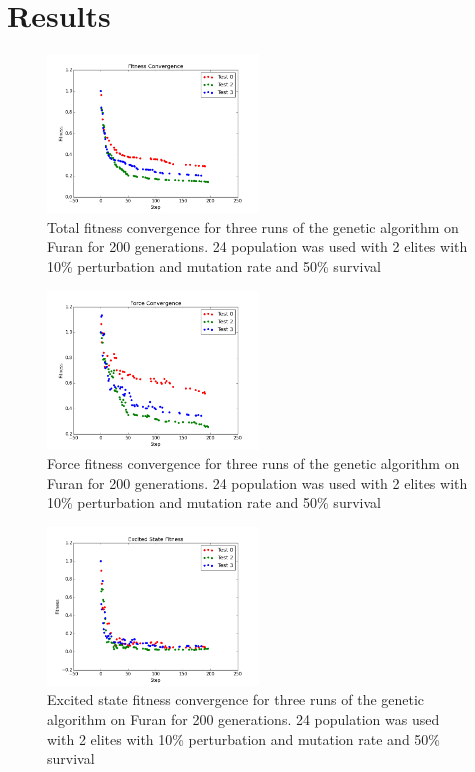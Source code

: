\documentclass[11pt, twocolumn]{article}
\begin{document}
\section{Results}
\begin{figure}[total]
  \centering
  \includegraphics[width=0.5\textwidth]{furan_convergence}
  \caption{Total fitness convergence for three runs of the genetic algorithm on Furan for 200 generations.
  24 population was used with 2 elites with 10\% perturbation and mutation rate and 50\% survival}
\end{figure}

\begin{figure}[force]
  \centering
  \includegraphics[width=0.5\textwidth]{furan_force_convergence}
  \caption{Force fitness convergence for three runs of the genetic algorithm on Furan for 200 generations.
  24 population was used with 2 elites with 10\% perturbation and mutation rate and 50\% survival}
\end{figure}

\begin{figure}[es]
  \centering
  \includegraphics[width=0.5\textwidth]{furan_es_convergence}
  \caption{Excited state fitness convergence for three runs of the genetic algorithm on Furan for 200 generations.
  24 population was used with 2 elites with 10\% perturbation and mutation rate and 50\% survival}
\end{figure}
\end{document}
